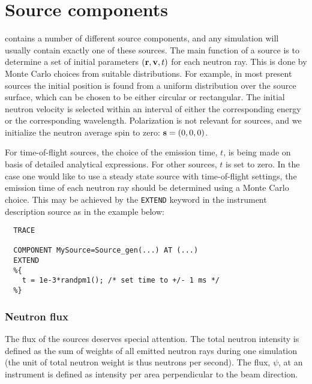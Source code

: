 
\chapter{Source components}
\label{c:source}

\MCS contains a number of different source components,
and any simulation will usually contain exactly one of these sources.
The main function of a source is to determine a set of initial
parameters $({\bf r}, {\bf v}, t)$
for each neutron ray. This is done by Monte Carlo choices from
suitable distributions. For example, in most present sources
the initial position is
found from a uniform distribution over the source surface,
which can be chosen to be either circular or rectangular.
The initial neutron velocity is selected within an interval
of either the corresponding energy or the corresponding wavelength.
Polarization is not relevant for sources,
and we initialize the neutron average spin to zero: ${\bf s}=(0,0,0)$.

For time-of-flight sources, the choice of the emission time, $t$,
is being made on basis of detailed analytical expressions.
For other sources, $t$ is set to zero.
In the case one would like to use a steady state source
with time-of-flight settings,
the emission time of each neutron ray should be determined using
a Monte Carlo choice. This may be achieved by
the \verb+EXTEND+ keyword in the instrument description source
as in the example below:

\begin{lstlisting}
  TRACE

  COMPONENT MySource=Source_gen(...) AT (...)
  EXTEND
  %{
    t = 1e-3*randpm1(); /* set time to +/- 1 ms */
  %}
\end{lstlisting}

\subsection{Neutron flux}
\label{s:neutron-flux}
The flux of the sources deserves special attention. The total neutron
intensity is defined as the sum of weights of all emitted neutron rays
during one simulation
(the unit of total neutron weight is thus neutrons per second).
The flux, $\psi$, at an instrument is defined as intensity per area perpendicular
to the beam direction.

